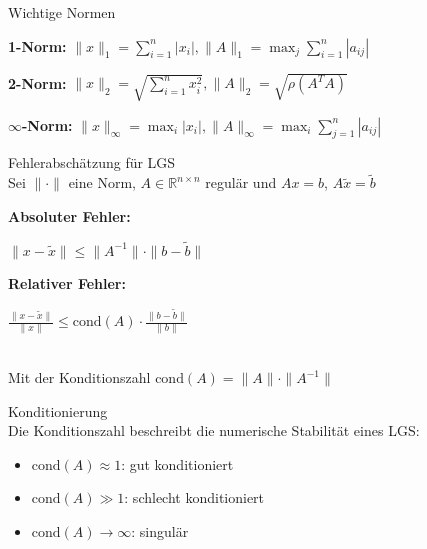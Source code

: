 \begin{concept}{Wichtige Normen}

\textbf{1-Norm:}
        $\|x\|_1 = \sum_{i=1}^n |x_i|,
        \|A\|_1 = \max_j \sum_{i=1}^n |a_{ij}|$

\textbf{2-Norm:}
        $\|x\|_2 = \sqrt{\sum_{i=1}^n x_i^2}, 
        \|A\|_2 = \sqrt{\rho(A^TA)}$

$\infty$\textbf{-Norm:}
        $\|x\|_\infty = \max_i |x_i|, 
        \|A\|_\infty = \max_i \sum_{j=1}^n |a_{ij}|$
\end{concept}

\begin{theorem}{Fehlerabschätzung für LGS}\\
Sei $\|\cdot\|$ eine Norm, $A \in \mathbb{R}^{n\times n}$ regulär und $Ax = b$, $A\tilde{x} = \tilde{b}$
\vspace{1mm}\\
\begin{minipage}[t]{0.47\textwidth}
    \textbf{Absoluter Fehler:}
    \vspace{-5mm}\\
    \begin{center}
        $\|x - \tilde{x}\| \leq \|A^{-1}\| \cdot \|b - \tilde{b}\|$
    \end{center}
\end{minipage}
\hspace{2mm}
\begin{minipage}[t]{0.47\textwidth}
    \textbf{Relativer Fehler:}
    \vspace{-5mm}\\
    \begin{center}
        $\frac{\|x - \tilde{x}\|}{\|x\|} \leq \text{cond}(A) \cdot \frac{\|b - \tilde{b}\|}{\|b\|}$
    \end{center}
\end{minipage}
\vspace{1mm}\\
Mit der Konditionszahl $\text{cond}(A) = \|A\| \cdot \|A^{-1}\|$
\end{theorem}

\begin{concept}{Konditionierung}\\
Die Konditionszahl beschreibt die numerische Stabilität eines LGS:
\begin{itemize}
    \item $\text{cond}(A) \approx 1$: gut konditioniert
    \item $\text{cond}(A) \gg 1$: schlecht konditioniert
    \item $\text{cond}(A) \to \infty$: singulär
\end{itemize}
\end{concept}

